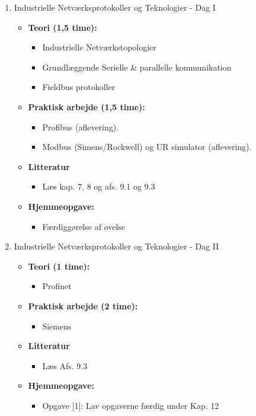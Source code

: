 \documentclass[12pt,a4paper]{article}
\begin{document}
\begin{enumerate}[leftmargin=*, label=\textbf{Dag \arabic* (3 timer)}]
		\item Industrielle Netværksprotokoller og Teknologier - Dag I
		\begin{itemize}
			\item \textbf{Teori (1,5 time):}
			\begin{itemize}
				\item Industrielle Netværkstopologier
				\item Grundlæggende Serielle \& parallelle kommunikation 
				\item Fieldbus protokoller
			\end{itemize}
			\item \textbf{Praktisk arbejde (1,5 time):}
			\begin{itemize}
				\item Profibus (aflevering).
				\item Modbus (Simens/Rockwell) og UR simulator (aflevering).
			\end{itemize}
			\item \textbf{Litteratur}
			\begin{itemize}
				\item Læs kap. 7, 8 og afs. 9.1 og 9.3
			\end{itemize}
			\item \textbf{Hjemmeopgave:}
			\begin{itemize}
				\item Færdiggørelse af øvelse
			\end{itemize}
		\end{itemize}
		
		\item Industrielle Netværksprotokoller og Teknologier - Dag II
		\begin{itemize}
			\item \textbf{Teori (1 time):}
			\begin{itemize}
				\item Profinet
			\end{itemize}
			\item \textbf{Praktisk arbejde (2 time):}
			\begin{itemize}
				\item Siemens 
			\end{itemize}
			\item \textbf{Litteratur}
			\begin{itemize}
				\item Læs Afs. 9.3
			\end{itemize}
			\item \textbf{Hjemmeopgave:}
			\begin{itemize}
				\item Opgave [1]: Lav opgaverne færdig under Kap. 12
			\end{itemize}
		\end{itemize}
		

\end{enumerate}
\end{document}
